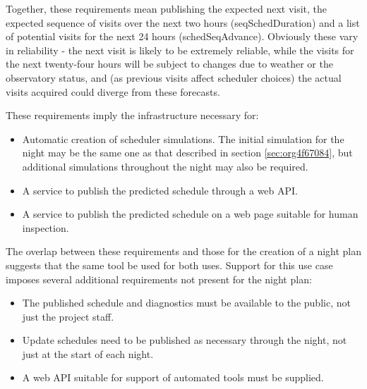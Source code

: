 Together, these requirements mean publishing the expected next visit, the expected sequence of visits over the next two hours (seqSchedDuration) and a list of potential visits for the next 24 hours (schedSeqAdvance). Obviously these vary in reliability - the next visit is likely to be extremely reliable, while the visits for the next twenty-four hours will be subject to changes due to weather or the observatory status, and (as previous visits affect scheduler choices) the actual visits acquired could diverge from these forecasts.

These requirements imply the infrastructure necessary for:
\begin{itemize}
\item Automatic creation of scheduler simulations. The initial simulation for the night may be the same one as that described in section \ref{sec:org4f67084}, but additional simulations throughout the night may also be required.
\item A service to publish the predicted schedule through a web API.
\item A service to publish the predicted schedule on a web page suitable for human inspection.
\end{itemize}

The overlap between these requirements and those for the creation of a night plan suggests that the same tool be used for both uses. 
Support for this use case imposes several additional requirements not present for the night plan:
\begin{itemize}
\item The published schedule and diagnostics must be available to the public, not just the project staff.
\item Update schedules need to be published as necessary through the night, not just at the start of each night.
\item A web API suitable for support of automated tools must be supplied.
\end{itemize}

